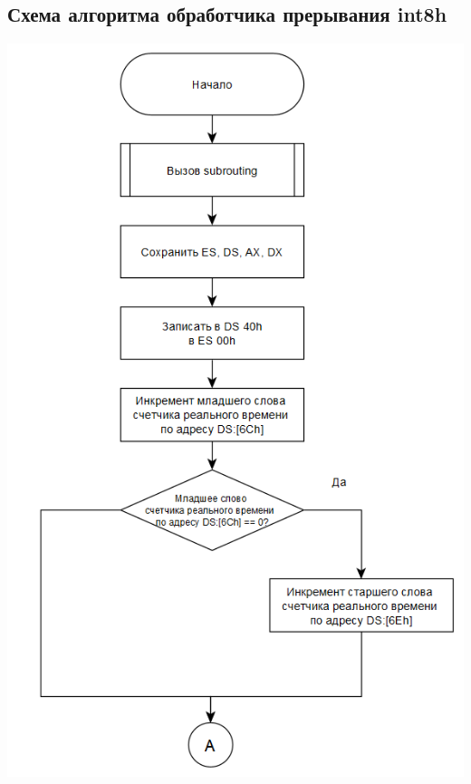 \documentclass{article}
\begin{document}
\subsection{Схема алгоритма обработчика прерывания int8h}
\begin{center}
	\noindent\includegraphics{tools/Screenshot_5.png}
	\clearpage

\end{center}
\end{document}
